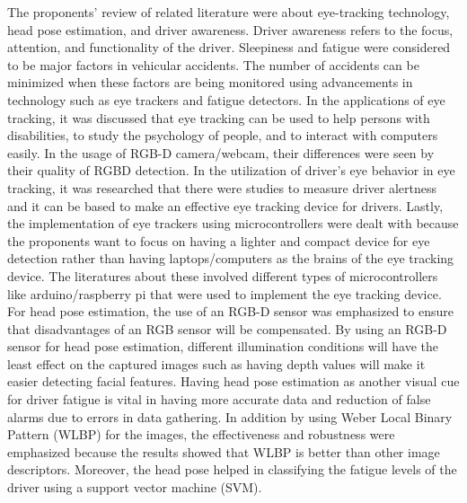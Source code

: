 The proponents’ review of related literature were about eye-tracking technology, head pose estimation, and driver awareness. Driver awareness refers to the focus, attention, and functionality of the driver. Sleepiness and fatigue were considered to be major factors in vehicular accidents. The number of accidents can be minimized when these factors are being monitored using advancements in technology such as eye trackers and fatigue detectors.  In the applications of eye tracking, it was discussed that eye tracking can be used to help persons with disabilities, to study the psychology of people, and to interact with computers easily. In the usage of RGB-D camera/webcam, their differences were seen by their quality of RGBD detection. In the utilization of driver’s eye behavior in eye tracking, it was researched that there were studies to measure driver alertness and it can be based to make an effective eye tracking device for drivers. Lastly, the implementation of eye trackers using microcontrollers were dealt with because the proponents want to focus on having a lighter and compact device for eye detection rather than having laptops/computers as the brains of the eye tracking device. The literatures about these involved different types of microcontrollers like arduino/raspberry pi that were used to implement the eye tracking device. For head pose estimation, the use of an RGB-D sensor was emphasized to ensure that disadvantages of an RGB sensor will be compensated. By using an RGB-D sensor for head pose estimation, different illumination conditions will have the least effect on the captured images such as having depth values will make it easier detecting facial features. Having head pose estimation as another visual cue for driver fatigue is vital in having more accurate data and reduction of false alarms due to errors in data gathering. In addition by using Weber Local Binary Pattern (WLBP) for the images, the effectiveness and robustness were emphasized because the results showed that WLBP is better than other image descriptors. Moreover, the head pose helped in classifying the fatigue levels of the driver using a support vector machine (SVM). 




